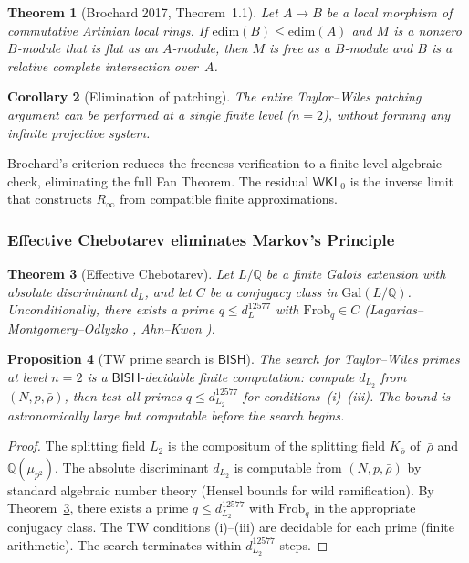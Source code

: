 \documentclass[11pt]{article}
\theoremstyle{plain}
\newtheorem{theorem}{Theorem}[section]
\newtheorem{proposition}[theorem]{Proposition}
\newtheorem{corollary}[theorem]{Corollary}
\theoremstyle{definition}
\theoremstyle{remark}
\newcommand{\Q}{\mathbb{Q}}
\newcommand{\Gal}{\mathrm{Gal}}
\newcommand{\Frob}{\mathrm{Frob}}
\newcommand{\edim}{\mathrm{edim}}
\newcommand{\BISH}{\mathsf{BISH}}
\newcommand{\WKL}{\mathsf{WKL}_0}
\begin{document}
\begin{theorem}[Brochard 2017, Theorem~1.1]\label{thm:brochard}
Let $A \to B$ be a local morphism of commutative Artinian local
rings.  If $\edim(B) \le \edim(A)$ and $M$ is a nonzero
$B$-module that is flat as an $A$-module, then $M$ is free as
a $B$-module and $B$ is a relative complete intersection
over~$A$.
\end{theorem}

\begin{corollary}[Elimination of patching]\label{cor:brochard}
The entire Taylor--Wiles patching argument can be performed at a
single finite level ($n = 2$), without forming any infinite
projective system.
\end{corollary}

Brochard's criterion reduces the freeness verification to a
finite-level algebraic check, eliminating the full Fan Theorem.
The residual $\WKL$ is the inverse limit that constructs
$R_\infty$ from compatible finite approximations.

\subsubsection{Effective Chebotarev eliminates Markov's Principle}

\begin{theorem}[Effective Chebotarev]\label{thm:cheb}
Let $L/\Q$ be a finite Galois extension with absolute discriminant
$d_L$, and let $C$ be a conjugacy class in $\Gal(L/\Q)$.
Unconditionally, there exists a prime $q \le d_L^{12577}$
with $\Frob_q \in C$
(Lagarias--Montgomery--Odlyzko \cite{LMO1979},
Ahn--Kwon \cite{AhnKwon2019}).
\end{theorem}

\begin{proposition}[TW prime search is $\BISH$]\label{prop:tw}
The search for Taylor--Wiles primes at level $n = 2$ is a
$\BISH$-decidable finite computation: compute $d_{L_2}$ from
$(N, p, \bar{\rho})$, then test all primes
$q \le d_{L_2}^{12577}$ for conditions~(i)--(iii).
The bound is astronomically large but computable before the
search begins.
\end{proposition}

\begin{proof}
The splitting field $L_2$ is the compositum of the splitting field
$K_{\bar{\rho}}$ of~$\bar{\rho}$ and $\Q(\mu_{p^2})$.  The
absolute discriminant $d_{L_2}$ is computable from $(N, p,
\bar{\rho})$ by standard algebraic number theory (Hensel bounds for
wild ramification).  By Theorem~\ref{thm:cheb}, there exists a
prime $q \le d_{L_2}^{12577}$ with $\Frob_q$ in the appropriate
conjugacy class.  The TW conditions (i)--(iii) are decidable for
each prime (finite arithmetic).  The search terminates within
$d_{L_2}^{12577}$ steps.
\end{proof}
\end{document}
